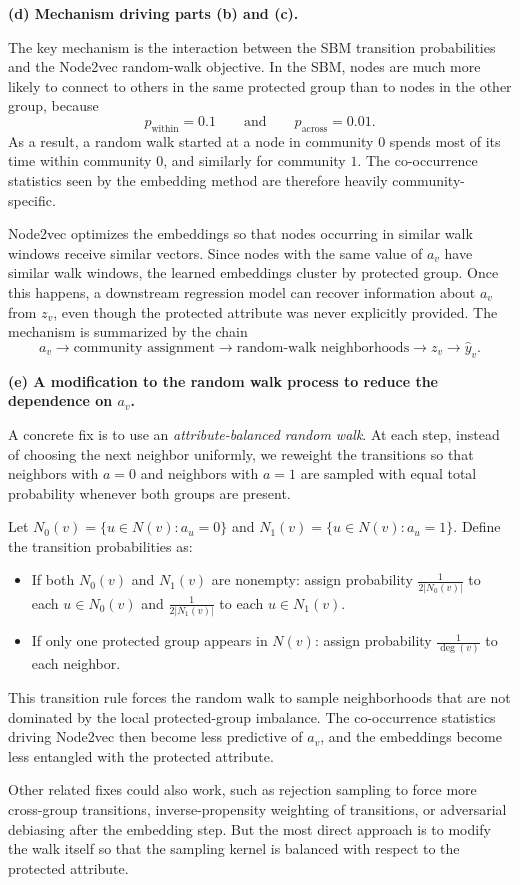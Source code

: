 \documentclass{article}
\begin{document}
\begin{tcolorbox}[colback=white, colframe=black!75, breakable, title=\textbf{Solution to Exercise 3}]
\bigskip
\textbf{(d) Mechanism driving parts (b) and (c).}

The key mechanism is the interaction between the SBM transition probabilities and the Node2vec random-walk objective. In the SBM, nodes are much more likely to connect to others in the same protected group than to nodes in the other group, because
\[
p_{\text{within}}=0.1 \qquad \text{and} \qquad p_{\text{across}}=0.01.
\]
As a result, a random walk started at a node in community $0$ spends most of its time within community $0$, and similarly for community $1$. The co-occurrence statistics seen by the embedding method are therefore heavily community-specific.

Node2vec optimizes the embeddings so that nodes occurring in similar walk windows receive similar vectors. Since nodes with the same value of $a_v$ have similar walk windows, the learned embeddings cluster by protected group. Once this happens, a downstream regression model can recover information about $a_v$ from $z_v$, even though the protected attribute was never explicitly provided. The mechanism is summarized by the chain
\[
a_v \longrightarrow \text{community assignment} \longrightarrow \text{random-walk neighborhoods} \longrightarrow z_v \longrightarrow \hat y_v.
\]

\bigskip
\textbf{(e) A modification to the random walk process to reduce the dependence on $a_v$.}

A concrete fix is to use an \emph{attribute-balanced random walk}. At each step, instead of choosing the next neighbor uniformly, we reweight the transitions so that neighbors with $a=0$ and neighbors with $a=1$ are sampled with equal total probability whenever both groups are present.

Let $N_0(v)=\{u\in N(v): a_u=0\}$ and $N_1(v)=\{u\in N(v): a_u=1\}$. Define the transition probabilities as:
\begin{itemize}
    \item If both $N_0(v)$ and $N_1(v)$ are nonempty: assign probability $\tfrac{1}{2|N_0(v)|}$ to each $u\in N_0(v)$ and $\tfrac{1}{2|N_1(v)|}$ to each $u\in N_1(v)$.
    \item If only one protected group appears in $N(v)$: assign probability $\tfrac{1}{\deg(v)}$ to each neighbor.
\end{itemize}

This transition rule forces the random walk to sample neighborhoods that are not dominated by the local protected-group imbalance. The co-occurrence statistics driving Node2vec then become less predictive of $a_v$, and the embeddings become less entangled with the protected attribute.

Other related fixes could also work, such as rejection sampling to force more cross-group transitions, inverse-propensity weighting of transitions, or adversarial debiasing after the embedding step. But the most direct approach is to modify the walk itself so that the sampling kernel is balanced with respect to the protected attribute.
\end{tcolorbox}
\end{document}
